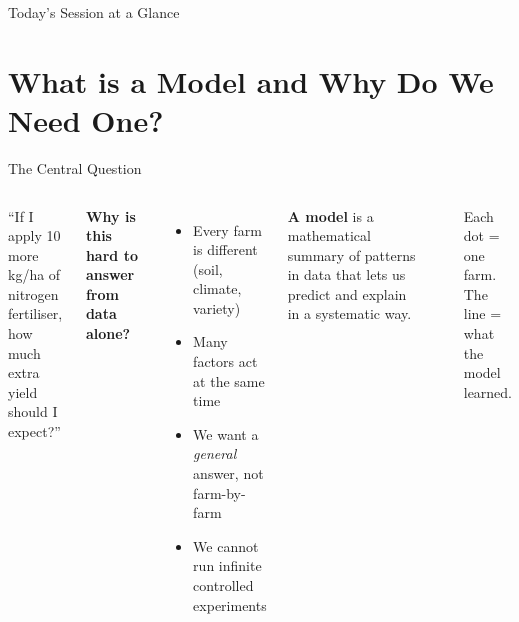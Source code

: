 \documentclass[aspectratio=169,10pt]{beamer}
\begin{document}
\begin{frame}{Today's Session at a Glance}
  \tableofcontents[hideallsubsections]
\end{frame}

\section{What is a Model and Why Do We Need One?}

\begin{frame}{The Central Question}
  \begin{columns}
      \begin{tcolorbox}[keybox]
        \large\centering
        ``If I apply 10 more kg/ha of nitrogen fertiliser,\\
        how much extra yield should I expect?''
      \end{tcolorbox}
      \vspace{0.4cm}
      \textbf{Why is this hard to answer from data alone?}
      \begin{itemize}
        \item Every farm is different (soil, climate, variety)
        \item Many factors act at the same time
        \item We want a \emph{general} answer, not farm-by-farm
        \item We cannot run infinite controlled experiments
      \end{itemize}
      \vspace{0.3cm}
      \textbf{A model} is a mathematical summary of patterns in data that
      lets us predict and explain in a systematic way.
      \begin{center}
      \end{center}
      \small\centering Each dot = one farm.\\The line = what the model learned.
  \end{columns}
\end{frame}
\end{document}

